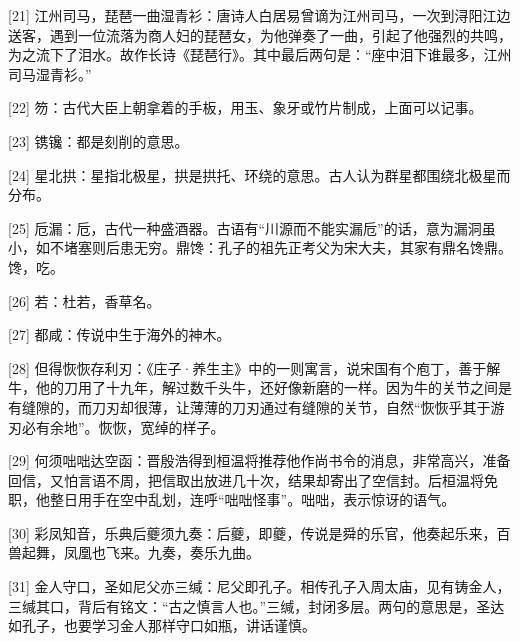 \documentclass[12pt,UTF8]{ctexbook}
\begin{document}
[21] 江州司马，琵琶一曲湿青衫：唐诗人白居易曾谪为江州司马，一次到浔阳江边送客，遇到一位流落为商人妇的琵琶女，为他弹奏了一曲，引起了他强烈的共鸣，为之流下了泪水。故作长诗《琵琶行》。其中最后两句是：“座中泪下谁最多，江州司马湿青衫。”

[22] 笏：古代大臣上朝拿着的手板，用玉、象牙或竹片制成，上面可以记事。

[23] 镌镵：都是刻削的意思。

[24] 星北拱：星指北极星，拱是拱托、环绕的意思。古人认为群星都围绕北极星而分布。

[25] 卮漏：卮，古代一种盛酒器。古语有“川源而不能实漏卮”的话，意为漏洞虽小，如不堵塞则后患无穷。鼎馋：孔子的祖先正考父为宋大夫，其家有鼎名馋鼎。馋，吃。

[26] 若：杜若，香草名。

[27] 都咸：传说中生于海外的神木。

[28] 但得恢恢存利刃：《庄子·养生主》中的一则寓言，说宋国有个庖丁，善于解牛，他的刀用了十九年，解过数千头牛，还好像新磨的一样。因为牛的关节之间是有缝隙的，而刀刃却很薄，让薄薄的刀刃通过有缝隙的关节，自然“恢恢乎其于游刃必有余地”。恢恢，宽绰的样子。

[29] 何须咄咄达空函：晋殷浩得到桓温将推荐他作尚书令的消息，非常高兴，准备回信，又怕言语不周，把信取出放进几十次，结果却寄出了空信封。后桓温将免职，他整日用手在空中乱划，连呼“咄咄怪事”。咄咄，表示惊讶的语气。

[30] 彩凤知音，乐典后夔须九奏：后夔，即夔，传说是舜的乐官，他奏起乐来，百兽起舞，凤凰也飞来。九奏，奏乐九曲。

[31] 金人守口，圣如尼父亦三缄：尼父即孔子。相传孔子入周太庙，见有铸金人，三缄其口，背后有铭文：“古之慎言人也。”三缄，封闭多层。两句的意思是，圣达如孔子，也要学习金人那样守口如瓶，讲话谨慎。

\backmatter
\end{document}
